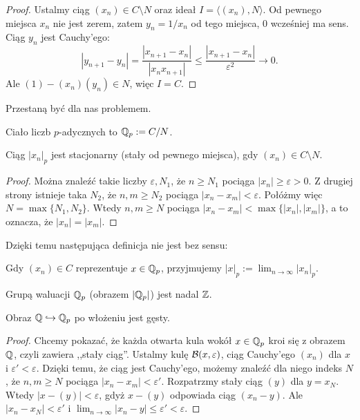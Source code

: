 \begin{proof}
Ustalmy ciąg $(x_n) \in C \setminus N$ oraz ideał $I = \langle (x_n), N \rangle$.
Od pewnego miejsca $x_n$ nie jest zerem, zatem $y_n = 1/x_n$ od tego miejsca, $0$ wcześniej ma sens.
Ciąg $y_n$ jest Cauchy'ego:
\[
	|y_{n+1} - y_n| = \frac{|x_{n+1} - x_n|}{|x_nx_{n+1}|} \le \frac{|x_{n+1}-x_n|}{\varepsilon^2} \to 0.
\]
Ale $(1) - (x_n)(y_n) \in N$, więc $I = C$.
\end{proof}

Przestaną być dla nas problemem.

\begin{definicja}
	Ciało liczb $p$-adycznych to $\mathbb Q_p := C / N$.
\end{definicja}

\begin{lemat}
	Ciąg $|x_n|_p$ jest stacjonarny (stały od pewnego miejsca), gdy $(x_n) \in C \setminus N$.
\end{lemat}

\begin{proof}
	Można znaleźć takie liczby $\varepsilon, N_1$, że $n \ge N_1$ pociąga $|x_n| \ge \varepsilon > 0$.
	Z drugiej strony istnieje taka $N_2$, że $n, m \ge N_2$ pociąga $|x_n - x_m| < \varepsilon$.
	Połóżmy więc $N = \max\{N_1, N_2\}$.
	Wtedy $n, m \ge N$ pociąga $|x_n - x_m| < \max\{|x_n|, |x_m|\}$, a to oznacza, że $|x_n| = |x_m|$.
\end{proof}

Dzięki temu następująca definicja nie jest bez sensu:

\begin{definicja}
	Gdy $(x_n) \in C$ reprezentuje $x \in \mathbb Q_p$, przyjmujemy $|x|_p := \lim_{n \to \infty} |x_n|_p$.
\end{definicja}

\begin{fakt}
	Grupą waluacji $\mathbb Q_p$ (obrazem $|\mathbb Q_p|$) jest nadal $\mathbb Z$.
\end{fakt}


\begin{lemat}
	Obraz $\mathbb Q \hookrightarrow \mathbb Q_p$ po włożeniu jest gęsty.
\end{lemat}

\begin{proof}
	Chcemy pokazać, że każda otwarta kula wokół $x \in \mathbb Q_p$ kroi się z obrazem $\mathbb Q$, czyli zawiera ,,stały ciąg''.
	Ustalmy kulę $\mathcal B(x, \varepsilon)$, ciąg Cauchy'ego $(x_n)$ dla $x$ i $\varepsilon' < \varepsilon$.
	Dzięki temu, że ciąg jest Cauchy'ego, możemy znaleźć dla niego indeks $N$, że $n, m \ge N$ pociąga $|x_n - x_m| < \varepsilon'$.
	Rozpatrzmy stały ciąg $(y)$ dla $y = x_N$.
	Wtedy $|x - (y)| < \varepsilon$, gdyż $x - (y)$ odpowiada ciąg $(x_n-y)$.
	Ale $|x_n - x_N| < \varepsilon'$ i $\lim_{n \to \infty}|x_n - y| \le \varepsilon' < \varepsilon$.
\end{proof}

